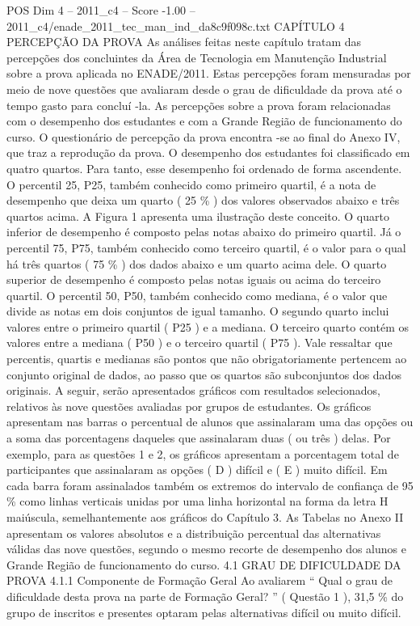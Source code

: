 \begin{textsample}{POS Dim 4 – 2011\_c4 – Score -1.00 – 2011\_c4/enade\_2011\_tec\_man\_ind\_da8c9f098c.txt}  \label{ex:f4_pos_235}
CAPÍTULO 4 PERCEPÇÃO DA PROVA As análises feitas neste capítulo tratam das percepções dos concluintes da Área de Tecnologia em Manutenção Industrial sobre a prova aplicada no ENADE/2011.
Estas percepções foram mensuradas por meio de nove questões que avaliaram desde o grau de dificuldade da prova até o tempo gasto para concluí -la.
As percepções sobre a prova foram relacionadas com o desempenho dos estudantes e com a Grande Região de funcionamento do curso.
O questionário de percepção da prova encontra -se ao final do Anexo IV, que traz a reprodução da prova.
O desempenho dos estudantes foi classificado em quatro quartos.
Para tanto, esse desempenho foi ordenado de forma ascendente.
O percentil 25, P25, também conhecido como primeiro quartil, é a nota de desempenho que deixa um quarto ( 25 \% ) dos valores observados abaixo e três quartos acima.
A Figura 1 apresenta uma ilustração deste conceito.
O quarto inferior de desempenho é composto pelas notas abaixo do primeiro quartil.
Já o percentil 75, P75, também conhecido como terceiro quartil, é o valor para o qual há três quartos ( 75 \% ) dos dados abaixo e um quarto acima dele.
O quarto superior de desempenho é composto pelas notas iguais ou acima do terceiro quartil.
O percentil 50, P50, também conhecido como mediana, é o valor que divide as notas em dois conjuntos de igual tamanho.
O segundo quarto inclui valores entre o primeiro quartil ( P25 ) e a mediana.
O terceiro quarto contém os valores entre a mediana ( P50 ) e o terceiro quartil ( P75 ).
Vale ressaltar que percentis, quartis e medianas são pontos que não obrigatoriamente pertencem ao conjunto original de dados, ao passo que os quartos são subconjuntos dos dados originais.
A seguir, serão apresentados gráficos com resultados selecionados, relativos às nove questões avaliadas por grupos de estudantes.
Os gráficos apresentam nas barras o percentual de alunos que assinalaram uma das opções ou a soma das porcentagens daqueles que assinalaram duas ( ou três ) delas.
Por exemplo, para as questões 1 e 2, os gráficos apresentam a porcentagem total de participantes que assinalaram as opções ( D ) difícil e ( E ) muito difícil.
Em cada barra foram assinalados também os extremos do intervalo de confiança de 95 \% como linhas verticais unidas por uma linha horizontal na forma da letra H maiúscula, semelhantemente aos gráficos do Capítulo 3.
As Tabelas no Anexo II apresentam os valores absolutos e a distribuição percentual das alternativas válidas das nove questões, segundo o mesmo recorte de desempenho dos alunos e Grande Região de funcionamento do curso. 4.1 GRAU DE DIFICULDADE DA PROVA 4.1.1 Componente de Formação Geral Ao avaliarem “ Qual o grau de dificuldade desta prova na parte de Formação Geral? ” ( Questão 1 ), 31,5 \% do grupo de inscritos e presentes optaram pelas alternativas difícil ou muito difícil.

\end{textsample}
